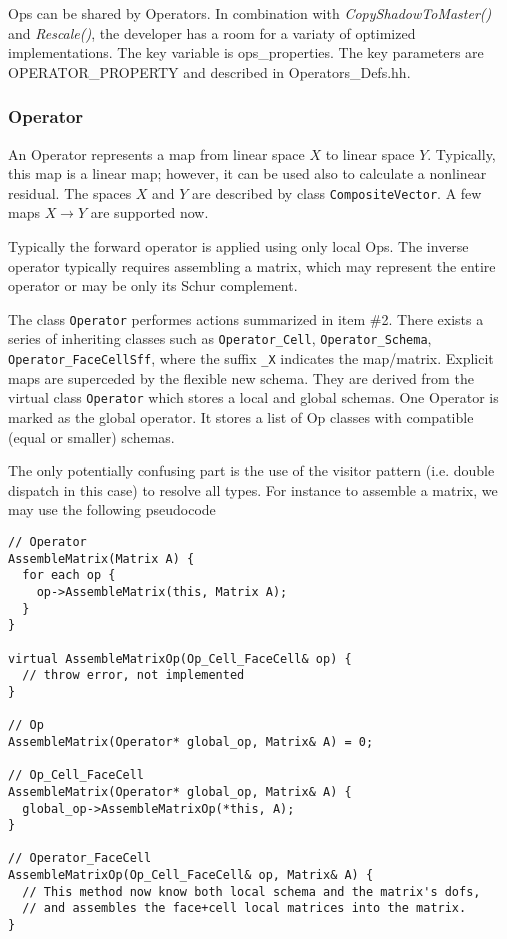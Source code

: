 Ops can be shared by Operators. 
In combination with {\it CopyShadowToMaster()} and {\it Rescale()},
the developer has a room for a variaty of optimized implementations.
The key variable is ops\_properties. The key parameters are 
OPERATOR\_PROPERTY and described in Operators\_Defs.hh.


\subsubsection{Operator}
An Operator represents a map from linear space $X$ to linear space $Y$.
Typically, this map is a linear map; however, it can be used also to calculate
a nonlinear residual. 
The spaces $X$ and $Y$ are described by class {\tt CompositeVector}. 
A few maps $X \to Y$ are supported now.

Typically the forward operator is applied using only local Ops.
The inverse operator typically requires assembling a matrix, which 
may represent the entire operator or may be only its Schur complement.

The class {\tt Operator} performes actions summarized in item \#2. There exists
a series of inheriting classes such as {\tt Operator\_Cell}, {\tt Operator\_Schema}, 
{\tt Operator\_FaceCellSff}, where the suffix {\tt \_X} indicates the map/matrix.
Explicit maps are superceded by the flexible new schema.
They are derived from the virtual class {\tt Operator} which stores a local 
and global schemas. 
One Operator is marked as the global operator. It stores a list of Op classes
with compatible (equal or smaller) schemas.

The only potentially confusing part is the use of the visitor pattern (i.e. double 
dispatch in this case) to resolve all types.  
For instance to assemble a matrix, we may use the following pseudocode

\begin{verbatim}
// Operator
AssembleMatrix(Matrix A) {
  for each op {
    op->AssembleMatrix(this, Matrix A);
  }
}

virtual AssembleMatrixOp(Op_Cell_FaceCell& op) { 
  // throw error, not implemented
}

// Op
AssembleMatrix(Operator* global_op, Matrix& A) = 0;

// Op_Cell_FaceCell
AssembleMatrix(Operator* global_op, Matrix& A) {
  global_op->AssembleMatrixOp(*this, A);
}

// Operator_FaceCell
AssembleMatrixOp(Op_Cell_FaceCell& op, Matrix& A) {
  // This method now know both local schema and the matrix's dofs, 
  // and assembles the face+cell local matrices into the matrix.
}
\end{verbatim}

